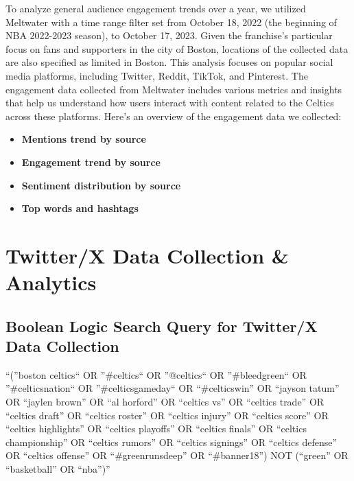 \documentclass[
]{book}
\begin{document}
To analyze general audience engagement trends over a year, we utilized Meltwater with a time range filter set from October 18, 2022 (the beginning of NBA 2022-2023 season), to October 17, 2023. Given the franchise's particular focus on fans and supporters in the city of Boston, locations of the collected data are also specified as limited in Boston. This analysis focuses on popular social media platforms, including Twitter, Reddit, TikTok, and Pinterest. The engagement data collected from Meltwater includes various metrics and insights that help us understand how users interact with content related to the Celtics across these platforms. Here's an overview of the engagement data we collected:

\begin{itemize}
\item
  \textbf{Mentions trend by source}
\item
  \textbf{Engagement trend by source}
\item
  \textbf{Sentiment distribution by source}
\item
  \textbf{Top words and hashtags}
\end{itemize}

\hypertarget{twitterx-data-collection-analytics}{%
\section{Twitter/X Data Collection \& Analytics}\label{twitterx-data-collection-analytics}}

\hypertarget{boolean-logic-search-query-for-twitterx-data-collection}{%
\subsection{Boolean Logic Search Query for Twitter/X Data Collection}\label{boolean-logic-search-query-for-twitterx-data-collection}}

``(''boston celtics`` OR ''\#celtics`` OR ''@celtics`` OR ''\#bleedgreen`` OR ''\#celticsnation`` OR
''\#celticsgameday`` OR ``\#celticswin'' OR ``jayson tatum'' OR ``jaylen brown'' OR ``al horford'' OR ``celtics vs'' OR ``celtics trade'' OR ``celtics draft'' OR ``celtics roster'' OR ``celtics injury'' OR ``celtics score'' OR ``celtics highlights'' OR ``celtics playoffs'' OR ``celtics finals'' OR ``celtics championship'' OR ``celtics rumors'' OR ``celtics signings'' OR ``celtics defense'' OR ``celtics offense'' OR ``\#greenrunsdeep'' OR ``\#banner18'') NOT (``green'' OR ``basketball'' OR ``nba'')''
\end{document}
